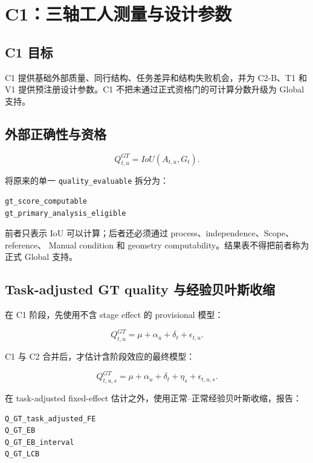 \section{C1：三轴工人测量与设计参数}

\subsection{C1 目标}

C1 提供基础外部质量、同行结构、任务差异和结构失败机会，并为 C2-B、T1 和 V1
提供预注册设计参数。C1 不把未通过正式资格门的可计算分数升级为 Global 支持。

\subsection{外部正确性与资格}

\[
Q^{GT}_{t,u}=IoU(A_{t,u},G_t).
\]

将原来的单一 \texttt{quality\_evaluable} 拆分为：

\begin{verbatim}
gt_score_computable
gt_primary_analysis_eligible
\end{verbatim}

前者只表示 IoU 可以计算；后者还必须通过 process、independence、Scope、reference、
Manual condition 和 geometry computability。结果表不得把前者称为正式 Global 支持。

\subsection{Task-adjusted GT quality 与经验贝叶斯收缩}

在 C1 阶段，先使用不含 stage effect 的 provisional 模型：

\[
Q^{GT}_{t,u}=\mu+\alpha_u+\delta_t+\epsilon_{t,u}.
\]

C1 与 C2 合并后，才估计含阶段效应的最终模型：

\[
Q^{GT}_{t,u,s}=\mu+\alpha_u+\delta_t+\eta_s+\epsilon_{t,u,s}.
\]

在 task-adjusted fixed-effect 估计之外，使用正常--正常经验贝叶斯收缩，报告：

\begin{verbatim}
Q_GT_task_adjusted_FE
Q_GT_EB
Q_GT_EB_interval
Q_GT_LCB
\end{verbatim}

